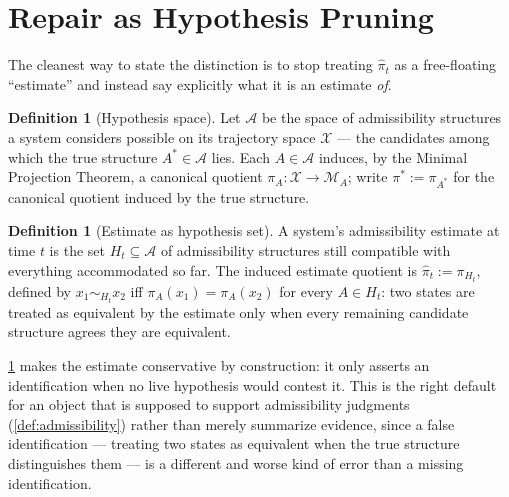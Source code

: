 \documentclass[11pt]{book}
\theoremstyle{plain}
\theoremstyle{definition}
\newtheorem{definition}[theorem]{Definition}
\theoremstyle{remark}
\begin{document}
\section{Repair as Hypothesis Pruning}

The cleanest way to state the distinction is to stop treating
$\hat\pi_t$ as a free-floating \enquote{estimate} and instead say
explicitly what it is an estimate \emph{of}.

\begin{definition}[Hypothesis space]
\label{def:hypothesis-space}
Let $\mathcal{A}$ be the space of admissibility structures a system
considers possible on its trajectory space $\mathcal{X}$ --- the
candidates among which the true structure $A^* \in \mathcal{A}$ lies.
Each $A \in \mathcal{A}$ induces, by the Minimal Projection Theorem, a
canonical quotient $\pi_A : \mathcal{X} \to \mathcal{M}_A$; write
$\pi^* := \pi_{A^*}$ for the canonical quotient induced by the true
structure.
\end{definition}

\begin{definition}[Estimate as hypothesis set]
\label{def:estimate-as-set}
A system's admissibility estimate at time $t$ is the set $H_t
\subseteq \mathcal{A}$ of admissibility structures still compatible
with everything accommodated so far. The induced estimate quotient is
$\hat\pi_t := \pi_{H_t}$, defined by $x_1 \sim_{H_t} x_2$ iff $\pi_A(x_1)
= \pi_A(x_2)$ for every $A \in H_t$: two states are treated as
equivalent by the estimate only when every remaining candidate
structure agrees they are equivalent.
\end{definition}

\cref{def:estimate-as-set} makes the estimate conservative by
construction: it only asserts an identification when no live
hypothesis would contest it. This is the right default for an
object that is supposed to support admissibility judgments
(\cref{def:admissibility}) rather than merely summarize evidence,
since a false identification --- treating two states as equivalent
when the true structure distinguishes them --- is a different and
worse kind of error than a missing identification.
\end{document}
